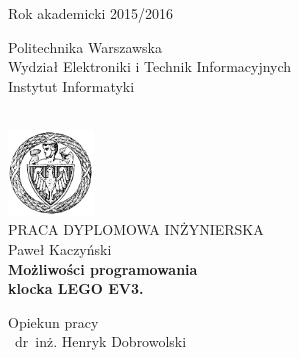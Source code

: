 \begin{titlepage}
    \begin{center}

        \begin{flushright}
            \begin{minipage}{0.35\textwidth}
                Rok akademicki 2015/2016
            \end{minipage}
        \end{flushright}

        \begin{flushleft}
            \begin{minipage}{0.57\textwidth}
                \begin{center}
                    \small
                    Politechnika Warszawska \\
                    Wydział Elektroniki i Technik Informacyjnych \\
                    Instytut Informatyki
                \end{center}
            \end{minipage}
        \end{flushleft}

        ~\\[2.0cm]

        \includegraphics[width=0.17\textwidth]{tytulowa_res/logo_pw.png}~\\[0.3cm]

        \Large PRACA DYPLOMOWA INŻYNIERSKA\\[0.5cm]

        \large Paweł Kaczyński \\[0.5cm]

        \LARGE \textbf{Możliwości programowania\\klocka LEGO EV3.}

        \vfill

        \begin{flushright}
            \begin{minipage}{0.5\textwidth}
                \begin{center} \normalsize
                    Opiekun pracy\\
                    ~dr~inż. Henryk Dobrowolski
                \end{center}
            \end{minipage}
        \end{flushright}


\end{center}
\end{titlepage}
